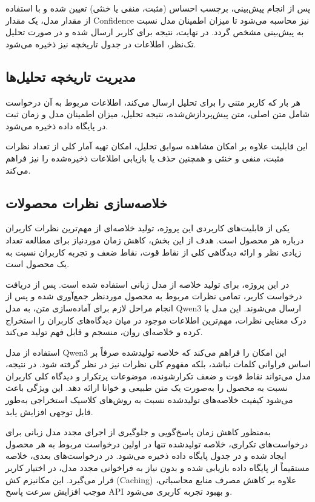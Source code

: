 پس از انجام پیش‌بینی، برچسب احساس (مثبت، منفی یا خنثی) تعیین شده و با استفاده از مقدار  مدل، یک مقدار Confidence نیز محاسبه می‌شود تا میزان اطمینان مدل نسبت به پیش‌بینی مشخص گردد. در نهایت، نتیجه برای کاربر ارسال شده و در صورت تحلیل تک‌نظر، اطلاعات در جدول تاریخچه نیز ذخیره می‌شود.
\subsection{مدیریت تاریخچه تحلیل‌ها}
هر بار که کاربر متنی را برای تحلیل ارسال می‌کند، اطلاعات مربوط به آن درخواست شامل متن اصلی، متن پیش‌پردازش‌شده، نتیجه تحلیل، میزان اطمینان مدل و زمان ثبت در پایگاه داده ذخیره می‌شود.

این قابلیت علاوه بر امکان مشاهده سوابق تحلیل، امکان تهیه آمار کلی از تعداد نظرات مثبت، منفی و خنثی و همچنین حذف یا بازیابی اطلاعات ذخیره‌شده را نیز فراهم می‌کند.
\subsection{خلاصه‌سازی نظرات محصولات }
یکی از قابلیت‌های کاربردی این پروژه، تولید خلاصه‌ای از مهم‌ترین نظرات کاربران درباره هر محصول است. هدف از این بخش، کاهش زمان موردنیاز برای مطالعه تعداد زیادی نظر و ارائه دیدگاهی کلی از نقاط قوت، نقاط ضعف و تجربه کاربران نسبت به یک محصول است.

در این پروژه، برای تولید خلاصه از مدل زبانی  استفاده شده است. پس از دریافت درخواست کاربر، تمامی نظرات مربوط به محصول موردنظر جمع‌آوری شده و پس از انجام مراحل لازم برای آماده‌سازی متن، به مدل Qwen3 ارسال می‌شوند. این مدل با درک معنایی نظرات، مهم‌ترین اطلاعات موجود در میان دیدگاه‌های کاربران را استخراج کرده و خلاصه‌ای روان، منسجم و قابل فهم تولید می‌کند.

استفاده از مدل Qwen3 این امکان را فراهم می‌کند که خلاصه تولیدشده صرفاً بر اساس فراوانی کلمات نباشد، بلکه مفهوم کلی نظرات نیز در نظر گرفته شود. در نتیجه، مدل می‌تواند نقاط قوت و ضعف تکرارشونده، موضوعات پرتکرار و دیدگاه کلی کاربران نسبت به محصول را به‌صورت یک متن طبیعی و خوانا ارائه دهد. این ویژگی باعث می‌شود کیفیت خلاصه‌های تولیدشده نسبت به روش‌های کلاسیک استخراجی به‌طور قابل توجهی افزایش یابد.

به‌منظور کاهش زمان پاسخ‌گویی و جلوگیری از اجرای مجدد مدل زبانی برای درخواست‌های تکراری، خلاصه تولیدشده تنها در اولین درخواست مربوط به هر محصول ایجاد شده و در جدول  پایگاه داده ذخیره می‌شود. در درخواست‌های بعدی، خلاصه مستقیماً از پایگاه داده بازیابی شده و بدون نیاز به فراخوانی مجدد مدل، در اختیار کاربر قرار می‌گیرد. این مکانیزم کش (Caching) علاوه بر کاهش مصرف منابع محاسباتی، موجب افزایش سرعت پاسخ API و بهبود تجربه کاربری می‌شود.

